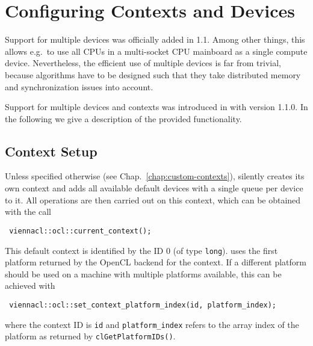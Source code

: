 
\chapter{Configuring Contexts and Devices} \label{chap:multi-devices}
Support for multiple devices was officially added in {\OpenCL} 1.1.
Among other things, this allows e.g.~to use all CPUs in a multi-socket CPU mainboard as a single {\OpenCL} compute device.
Nevertheless, the efficient use of multiple {\OpenCL} devices is far from trivial, because algorithms have to be designed such that 
they take distributed memory and synchronization issues into account.

Support for multiple devices and contexts was introduced in {\ViennaCL} with version 1.1.0. In the following we give a description of the 
provided functionality.

\section{Context Setup}
Unless specified otherwise (see Chap.~\ref{chap:custom-contexts}), {\ViennaCL} silently creates its own context and adds all available default devices with a single queue per device to it.
All operations are then carried out on this context, which can be obtained with the call
\begin{lstlisting}
 viennacl::ocl::current_context();
\end{lstlisting}
This default context is identified by the ID $0$ (of type \lstinline|long|).
{\ViennaCL} uses the first platform returned by the OpenCL backend for the context.
If a different platform should be used on a machine with multiple platforms available,
this can be achieved with
\begin{lstlisting}
 viennacl::ocl::set_context_platform_index(id, platform_index);
\end{lstlisting}
where the context ID is \lstinline|id| and \lstinline|platform_index| refers to the array index of the platform as returned by \lstinline|clGetPlatformIDs()|.

